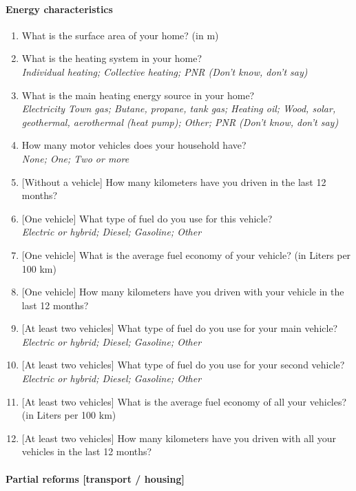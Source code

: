 \documentclass[english,5p,authoryear]{elsarticle}
\begin{document}
\begin{appendices}
\paragraph{Energy characteristics}
\begin{enumerate}[resume,leftmargin=*]
\item What is the surface area of your home? (in m\texttwosuperior )
\item What is the heating system in your home? \emph{}\\
\emph{Individual heating; Collective heating; PNR (Don't know, don't
say)}
\item What is the main heating energy source in your home? \emph{}\\
\emph{Electricity Town gas; Butane, propane, tank gas; Heating oil;
Wood, solar, geothermal, aerothermal (heat pump); Other; PNR (Don't
know, don't say)}
\item How many motor vehicles does your household have? \emph{}\\
\emph{None; One; Two or more} 
\item {[}Without a vehicle{]} How many kilometers have you driven in the
last 12 months? 
\item {[}One vehicle{]} What type of fuel do you use for this vehicle? \emph{}\\
\emph{Electric or hybrid; Diesel; Gasoline; Other} 
\item {[}One vehicle{]} What is the average fuel economy of your vehicle?
(in Liters per 100 km)
\item {[}One vehicle{]} How many kilometers have you driven with your vehicle
in the last 12 months?
\item {[}At least two vehicles{]} What type of fuel do you use for your
main vehicle?\\
 \emph{Electric or hybrid; Diesel; Gasoline; Other} 
\item {[}At least two vehicles{]} What type of fuel do you use for your
second vehicle?\\
 \emph{Electric or hybrid; Diesel; Gasoline; Other} 
\item {[}At least two vehicles{]} What is the average fuel economy of all
your vehicles? (in Liters per 100 km) 
\item {[}At least two vehicles{]} How many kilometers have you driven with
all your vehicles in the last 12 months? 
\end{enumerate}

\paragraph{Partial reforms {[}transport / housing{]}}


\end{appendices}
\end{document}

